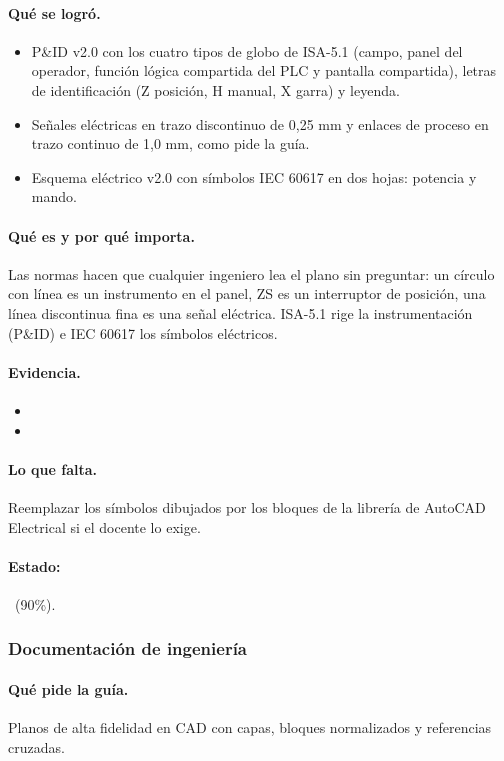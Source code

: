 \documentclass[a4paper,11pt]{article}
\begin{document}
\paragraph{Qué se logró.}
\begin{itemize}
\item P\&ID v2.0 con los cuatro tipos de globo de ISA-5.1 (campo, panel del operador, función lógica compartida del PLC y pantalla compartida), letras de identificación (Z posición, H manual, X garra) y leyenda.
\item Señales eléctricas en trazo discontinuo de 0,25 mm y enlaces de proceso en trazo continuo de 1,0 mm, como pide la guía.
\item Esquema eléctrico v2.0 con símbolos IEC 60617 en dos hojas: potencia y mando.
\end{itemize}
\paragraph{Qué es y por qué importa.} Las normas hacen que cualquier ingeniero lea el plano sin preguntar: un círculo con línea es un instrumento en el panel, ZS es un interruptor de posición, una línea discontinua fina es una señal eléctrica. ISA-5.1 rige la instrumentación (P\&ID) e IEC 60617 los símbolos eléctricos.
\paragraph{Evidencia.}
\begin{itemize}\small
\item {}
\item {}
\end{itemize}
\paragraph{Lo que falta.} Reemplazar los símbolos dibujados por los bloques de la librería de AutoCAD Electrical si el docente lo exige.
\paragraph{Estado:} \parcial~(90\%).
\subsubsection{Documentación de ingeniería}
\paragraph{Qué pide la guía.} Planos de alta fidelidad en CAD con capas, bloques normalizados y referencias cruzadas.
\end{document}
